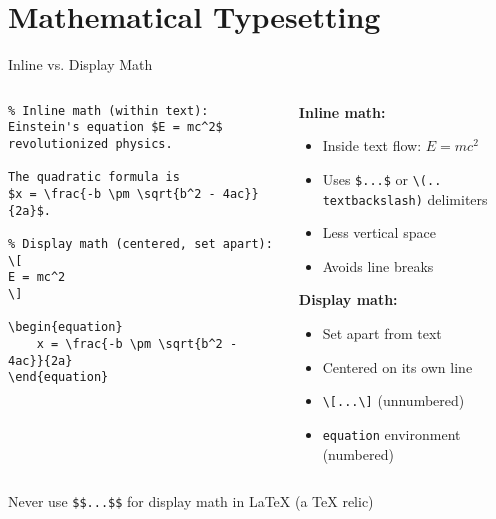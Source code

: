 \section{Mathematical Typesetting}

\begin{frame}[fragile]{Inline vs. Display Math}
    \begin{columns}
        \begin{column}{0.5\textwidth}
            \begin{lstlisting}
% Inline math (within text):
Einstein's equation $E = mc^2$ 
revolutionized physics.

The quadratic formula is 
$x = \frac{-b \pm \sqrt{b^2 - 4ac}}{2a}$.

% Display math (centered, set apart):
\[
E = mc^2
\]

\begin{equation}
    x = \frac{-b \pm \sqrt{b^2 - 4ac}}{2a}
\end{equation}
            \end{lstlisting}
        \end{column}
        
        \begin{column}{0.5\textwidth}
            \textbf{Inline math:}
            \begin{itemize}
                \item Inside text flow: $E = mc^2$
                \item Uses \texttt{\$...\$} or \texttt{\textbackslash(..\\textbackslash)} delimiters
                \item Less vertical space
                \item Avoids line breaks
            \end{itemize}
            
            \textbf{Display math:}
            \begin{itemize}
                \item Set apart from text
                \item Centered on its own line
                \item \texttt{\textbackslash[...\textbackslash]} (unnumbered)
                \item \texttt{equation} environment (numbered)
            \end{itemize}
        \end{column}
    \end{columns}
    
    \begin{warning}
        Never use \texttt{\$\$...\$\$} for display math in LaTeX (a TeX relic)
    \end{warning}
\end{frame}

